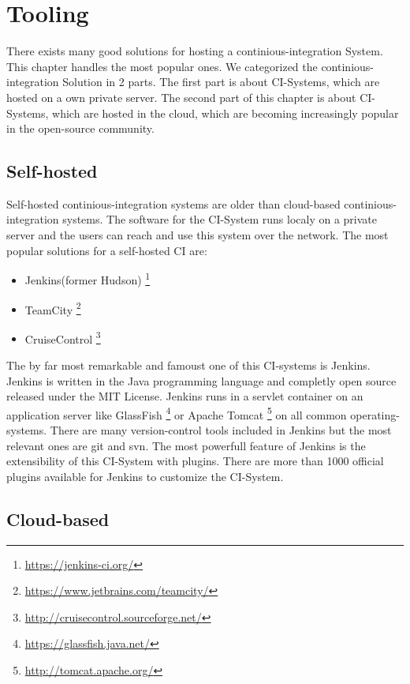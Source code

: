 \section{Tooling}\label{sec:tooling}

There exists many good solutions for hosting a continious-integration System. 
This chapter handles the most popular ones.
We categorized the continious-integration Solution in 2 parts.
The first part is about CI-Systems, which are hosted on a own private server. 
The second part of this chapter is about CI-Systems, which are hosted in the cloud, which are becoming increasingly popular in the open-source community.

\subsection{Self-hosted}\label{sec:tooling-self-hosted}

Self-hosted continious-integration systems are older than cloud-based continious-integration systems.
The software for the CI-System runs localy on a private server 
and the users can reach and use this system over the network. 
The most popular solutions for a self-hosted CI are:
\begin{itemize} 
    \item Jenkins(former Hudson) \footnote{\url{https://jenkins-ci.org/}}
    \item TeamCity \footnote{\url{https://www.jetbrains.com/teamcity/}}
    \item CruiseControl \footnote{\url{http://cruisecontrol.sourceforge.net/}}
\end{itemize}
The by far most remarkable and famoust one of this CI-systems is Jenkins. 
Jenkins is written in the Java programming language and completly open source released under the MIT License.
Jenkins runs in a servlet container on an application server like GlassFish \footnote{\url{https://glassfish.java.net/}}
or Apache Tomcat \footnote{\url{http://tomcat.apache.org/}}
on all common operating-systems.
There are many version-control tools included in Jenkins but the most relevant ones are git and svn.
The most powerfull feature of Jenkins is the extensibility of this CI-System with plugins.
There are more than 1000 official plugins available for Jenkins to customize the CI-System.  

\subsection{Cloud-based}\label{sec:tooling-cloud-based}

